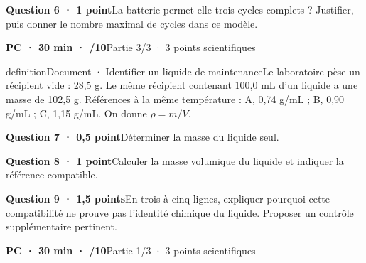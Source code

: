 \par\addvspace{3mm}\noindent\begin{minipage}{\linewidth}\textbf{Question 6 · 1 point}\quad La batterie permet-elle trois cycles complets ? Justifier, puis donner le nombre maximal de cycles dans ce modèle.\par\end{minipage}\par
\vfill{}
\textbf{PC · 30 min · /10}\hfill Partie 3/3 · 3 points scientifiques
\begin{pcEncadre}{definition}{Document · Identifier un liquide de maintenance}Le laboratoire pèse un récipient vide : 28,5 g. Le même récipient contenant 100,0 mL d’un liquide a une masse de 102,5 g. Références à la même température : A, 0,74 g/mL ; B, 0,90 g/mL ; C, 1,15 g/mL. On donne $\rho=m/V$.\end{pcEncadre}
\par\addvspace{3mm}\noindent\begin{minipage}{\linewidth}\textbf{Question 7 · 0,5 point}\quad Déterminer la masse du liquide seul.\par\end{minipage}\par
\par\addvspace{3mm}\noindent\begin{minipage}{\linewidth}\textbf{Question 8 · 1 point}\quad Calculer la masse volumique du liquide et indiquer la référence compatible.\par\end{minipage}\par
\par\addvspace{3mm}\noindent\begin{minipage}{\linewidth}\textbf{Question 9 · 1,5 points}\quad En trois à cinq lignes, expliquer pourquoi cette compatibilité ne prouve pas l’identité chimique du liquide. Proposer un contrôle supplémentaire pertinent.\par\end{minipage}\par
\vfill{}
\label{ann-12}
\textbf{PC · 30 min · /10}\hfill Partie 1/3 · 3 points scientifiques
